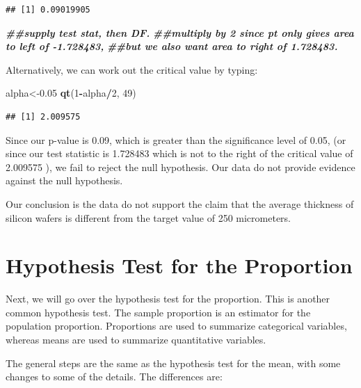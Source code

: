 \documentclass[
]{book}
\newenvironment{Shaded}{\begin{snugshade}}{\end{snugshade}}
\newcommand{\DecValTok}[1]{\textcolor[rgb]{0.00,0.00,0.81}{#1}}
\newcommand{\DocumentationTok}[1]{\textcolor[rgb]{0.56,0.35,0.01}{\textbf{\textit{#1}}}}
\newcommand{\FloatTok}[1]{\textcolor[rgb]{0.00,0.00,0.81}{#1}}
\newcommand{\FunctionTok}[1]{\textcolor[rgb]{0.13,0.29,0.53}{\textbf{#1}}}
\newcommand{\NormalTok}[1]{#1}
\newcommand{\OtherTok}[1]{\textcolor[rgb]{0.56,0.35,0.01}{#1}}
\newcommand{\SpecialCharTok}[1]{\textcolor[rgb]{0.81,0.36,0.00}{\textbf{#1}}}
\begin{document}
\begin{verbatim}
## [1] 0.09019905
\end{verbatim}

\begin{Shaded}
\begin{Highlighting}[]
\DocumentationTok{\#\#supply test stat, then DF.}
\DocumentationTok{\#\#multiply by 2 since pt only gives area to left of {-}1.728483, }
\DocumentationTok{\#\#but we also want area to right of 1.728483. }
\end{Highlighting}
\end{Shaded}

Alternatively, we can work out the critical value by typing:

\begin{Shaded}
\begin{Highlighting}[]
\NormalTok{alpha}\OtherTok{\textless{}{-}}\FloatTok{0.05}
\FunctionTok{qt}\NormalTok{(}\DecValTok{1}\SpecialCharTok{{-}}\NormalTok{alpha}\SpecialCharTok{/}\DecValTok{2}\NormalTok{, }\DecValTok{49}\NormalTok{)}
\end{Highlighting}
\end{Shaded}

\begin{verbatim}
## [1] 2.009575
\end{verbatim}

Since our p-value is 0.09, which is greater than the significance level of 0.05, (or since our test statistic is 1.728483 which is not to the right of the critical value of 2.009575 ), we fail to reject the null hypothesis. Our data do not provide evidence against the null hypothesis.

Our conclusion is the data do not support the claim that the average thickness of silicon wafers is different from the target value of 250 micrometers.

\hypertarget{testprop}{%
\section{Hypothesis Test for the Proportion}\label{testprop}}

Next, we will go over the hypothesis test for the proportion. This is another common hypothesis test. The sample proportion is an estimator for the population proportion. Proportions are used to summarize categorical variables, whereas means are used to summarize quantitative variables.

The general steps are the same as the hypothesis test for the mean, with some changes to some of the details. The differences are:
\end{document}
